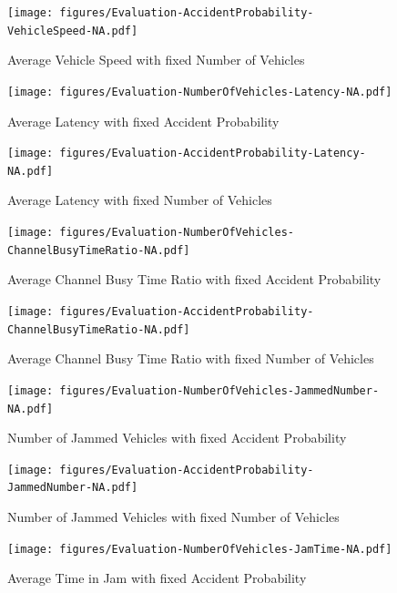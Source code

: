 \documentclass[]{nsm-thesis}
\begin{document}
\begin{figure}
	\centering
	\texttt{[image: figures/Evaluation-AccidentProbability-VehicleSpeed-NA.pdf]}
	\caption{Average Vehicle Speed with fixed Number of Vehicles}
	\label{fig:Evaluation-AccidentProbability-VehicleSpeed-NA}
\end{figure}

\begin{figure}
	\centering
	\texttt{[image: figures/Evaluation-NumberOfVehicles-Latency-NA.pdf]}
	\caption{Average Latency with fixed Accident Probability}
	\label{fig:Evaluation-NumberOfVehicles-Latency-NA}
\end{figure}

\begin{figure}
	\centering
	\texttt{[image: figures/Evaluation-AccidentProbability-Latency-NA.pdf]}
	\caption{Average Latency with fixed Number of Vehicles}
	\label{fig:Evaluation-AccidentProbability-Latency-NA}
\end{figure}

\begin{figure}
	\centering
	\texttt{[image: figures/Evaluation-NumberOfVehicles-ChannelBusyTimeRatio-NA.pdf]}
	\caption{Average Channel Busy Time Ratio with fixed Accident Probability}
	\label{fig:Evaluation-NumberOfVehicles-ChannelBusyTimeRatio-NA}
\end{figure}

\begin{figure}
	\centering
	\texttt{[image: figures/Evaluation-AccidentProbability-ChannelBusyTimeRatio-NA.pdf]}
	\caption{Average Channel Busy Time Ratio with fixed Number of Vehicles}
	\label{fig:Evaluation-AccidentProbability-ChannelBusyTimeRatio-NA}
\end{figure}

\begin{figure}
	\centering
	\texttt{[image: figures/Evaluation-NumberOfVehicles-JammedNumber-NA.pdf]}
	\caption{Number of Jammed Vehicles with fixed Accident Probability}
	\label{fig:Evaluation-NumberOfVehicles-JammedNumber-NA}
\end{figure}

\begin{figure}
	\centering
	\texttt{[image: figures/Evaluation-AccidentProbability-JammedNumber-NA.pdf]}
	\caption{Number of Jammed Vehicles with fixed Number of Vehicles}
	\label{fig:Evaluation-AccidentProbability-JammedNumber-NA}
\end{figure}

\begin{figure}
	\centering
	\texttt{[image: figures/Evaluation-NumberOfVehicles-JamTime-NA.pdf]}
	\caption{Average Time in Jam with fixed Accident Probability}
	\label{fig:Evaluation-NumberOfVehicles-JamTime-NA}
\end{figure}
\end{document}
